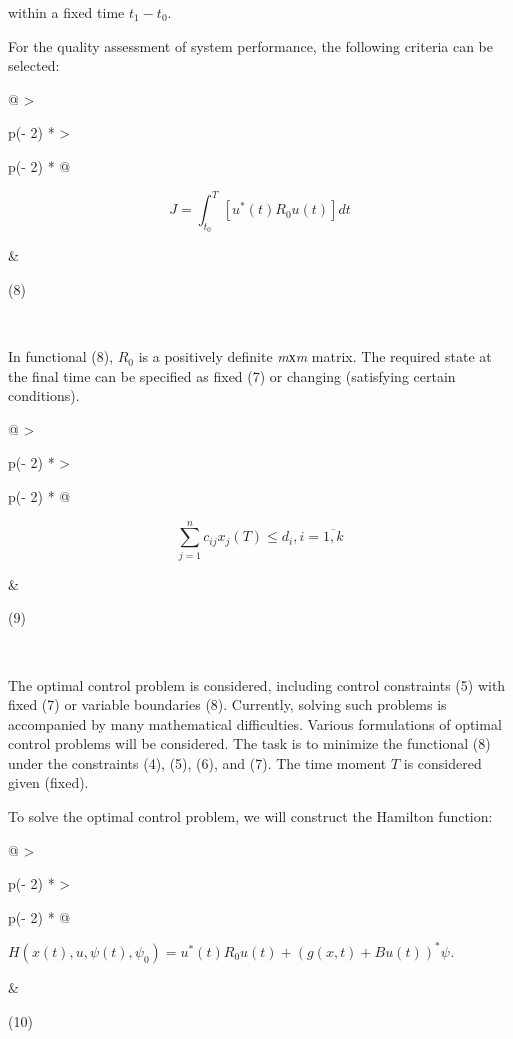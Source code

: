 within a fixed time \(t_{1} - t_{0}\).

For the quality assessment of system performance, the following criteria
can be selected:

\begin{longtable}[]{@{}
  >{\raggedright\arraybackslash}p{(\columnwidth - 2\tabcolsep) * }
  >{\raggedright\arraybackslash}p{(\columnwidth - 2\tabcolsep) * }@{}}
\begin{minipage}[b]{\linewidth}\raggedright
\[J = \int_{t_{0}}^{T}{\left\lbrack u^{*}(t)R_{0}u(t) \right\rbrack dt}\]
\end{minipage} & \begin{minipage}[b]{\linewidth}\raggedright
(8)
\end{minipage} \\
\end{longtable}

In functional (8), \(R_{0}\) is a positively definite \emph{m}х\emph{m}
matrix. The required state at the final time can be specified as fixed
(7) or changing (satisfying certain conditions).

\begin{longtable}[]{@{}
  >{\raggedright\arraybackslash}p{(\columnwidth - 2\tabcolsep) * }
  >{\raggedright\arraybackslash}p{(\columnwidth - 2\tabcolsep) * }@{}}
\begin{minipage}[b]{\linewidth}\raggedright
\[\sum_{j = 1}^{n}c_{ij}x_{j}(T) \leq d_{i},i = \overline{1,k}\]
\end{minipage} & \begin{minipage}[b]{\linewidth}\raggedright
(9)
\end{minipage} \\
\end{longtable}

The optimal control problem is considered, including control constraints
(5) with fixed (7) or variable boundaries (8). Currently, solving such
problems is accompanied by many mathematical difficulties. Various
formulations of optimal control problems will be considered. The task is
to minimize the functional (8) under the constraints (4), (5), (6), and
(7). The time moment \(T\) is considered given (fixed).

To solve the optimal control problem, we will construct the Hamilton
function:

\begin{longtable}[]{@{}
  >{\raggedright\arraybackslash}p{(\columnwidth - 2\tabcolsep) * }
  >{\raggedright\arraybackslash}p{(\columnwidth - 2\tabcolsep) * }@{}}
\begin{minipage}[b]{\linewidth}\raggedright
\(H\left( x(t),u,\psi(t),\psi_{0} \right) = u^{*}(t)R_{0}u(t) + (g(x,t) + Bu(t))^{*}\psi_{}\).
\end{minipage} & \begin{minipage}[b]{\linewidth}\raggedright
(10)
\end{minipage} \\
\end{longtable}


